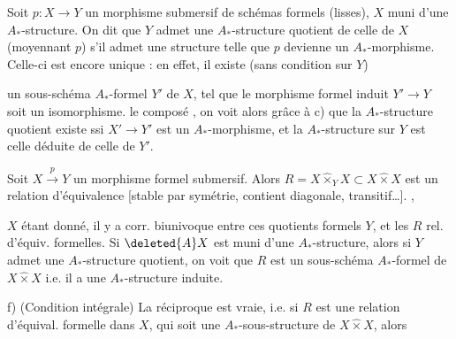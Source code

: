 Soit $p:X\to Y$ un morphisme submersif de schémas formels (lisses),  $X$ muni d'une $A_*$-structure. On dit que $Y$ admet une $A_*$-structure quotient de celle de $X$ (moyennant $p$) s'il admet une  structure telle que $p$ devienne un $A_*$-morphisme. Celle-ci est encore unique : en effet, il existe (sans condition sur $Y$)

un  sous-schéma $A_*$-formel $Y'$ de $X$, tel que le morphisme formel induit $Y'\to Y$ soit un isomorphisme.  le composé
, on voit alors grâce à c) que la $A_*$-structure quotient existe ssi $X'\to Y'$ est un $A_*$-morphisme, et la $A_*$-structure sur $Y$ est celle déduite de celle de $Y'$.

 Soit $X\xrightarrow{p}Y$ un morphisme formel submersif. Alors $R=X\mathbin{\widehat{\times}}_Y X\subset X\mathbin{\widehat{\times}}X$ est un  relation d'équivalence [stable par symétrie, contient diagonale, transitif\ldots]. ,

$X$ étant donné, il y a corr. biunivoque entre ces quotients formels $Y$, et les $R$ rel. d'équiv. formelles. Si $\deleted{A}X$ est muni d'une $A_*$-structure, alors si $Y$ admet une $A_*$-structure quotient, on voit que $R$ est un sous-schéma $A_*$-formel de $X\mathbin{\widehat{\times}}X$ i.e. il a une $A_*$-structure induite.

f) (Condition intégrale) La réciproque est vraie, i.e. si $R$ est une relation d'équival. formelle dans $X$, qui soit une $A_*$-sous-structure de $X\mathbin{\widehat{\times}}X$, alors
